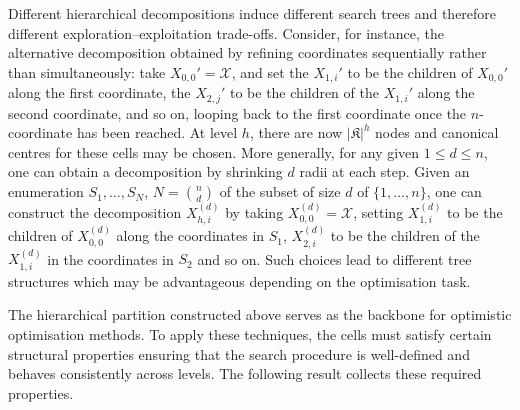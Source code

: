 \documentclass[10pt]{article}
\theoremstyle{definition}
\begin{document}
Different hierarchical decompositions induce different search trees and therefore different exploration--exploitation trade-offs. 
Consider, for instance, the alternative decomposition obtained by refining coordinates sequentially rather than simultaneously: take $X_{0, 0}' = \mathcal{X}$, and set the $X_{1, i}'$ to be the children of $X_{0, 0}'$ along the first coordinate, the $X_{2, j}'$ to be the children of the $X_{1, i}'$ along the second coordinate, and so on, looping back to the first coordinate once the $n$-coordinate has been reached. At level $h$, there are now $|\mathfrak{K}|^{h}$ nodes and canonical centres for these cells may be chosen. More generally, for any given $1 \le d \le n$, one can obtain a decomposition by shrinking $d$ radii at each step. Given an enumeration $S_1, \dotsc, S_N$, $N = \binom{n}{d}$ of the subset of size $d$ of $\{1, \dotsc, n\}$, one can construct the decomposition $X^{(d)}_{h, i}$
by taking $X^{(d)}_{0, 0} = \mathcal X$, setting $X^{(d)}_{1, i}$ to be the children of $X^{(d)}_{0, 0}$ along the coordinates in $S_1$, $X^{(d)}_{2, i}$ to be the children of the $X^{(d)}_{1, i}$ in the coordinates in $S_2$ and so on. Such choices lead to different tree structures which may be advantageous depending on the optimisation task.

The hierarchical partition constructed above serves as the backbone for optimistic optimisation methods. To apply these techniques, the cells must satisfy certain structural properties ensuring that the search procedure is well-defined and behaves consistently across levels. The following result collects these required properties.
\end{document}
